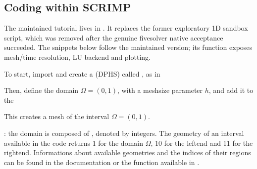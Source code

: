 \documentclass[letterpaper,10pt,english]{sphinxmanual}
\begin{document}
\subsection{Coding within SCRIMP}
\label{\detokenize{started:coding-within-scrimp}}
\sphinxAtStartPar
The maintained tutorial lives in .
It replaces the former exploratory 1D sandbox script, which was
removed after the genuine five\sphinxhyphen{}solver native acceptance succeeded.
The snippets below follow the maintained version; its function
 exposes mesh/time resolution, LU backend and plotting.

\sphinxAtStartPar
To start, import  and create a  (DPHS) called , as in 

\begin{sphinxVerbatim}[commandchars=\\\{\}]

  
\end{sphinxVerbatim}

\sphinxAtStartPar
Then, define the domain \(\Omega = (0,1)\), with a mesh\sphinxhyphen{}size
parameter \(h\), and add it to the 

\begin{sphinxVerbatim}[commandchars=\\\{\}]
  
    
\end{sphinxVerbatim}

\sphinxAtStartPar
This creates a mesh of the interval \(\Omega = (0,1)\).

\sphinxAtStartPar
{}: the domain is composed of ,
denoted by integers. The  geometry of an interval available in
the code returns 1 for the domain \(\Omega\), 10 for the left\sphinxhyphen{}end
and 11 for the right\sphinxhyphen{}end. Informations about available geometries and
the indices of their regions can be found in the documentation or 
the function  available in
.
\end{document}
